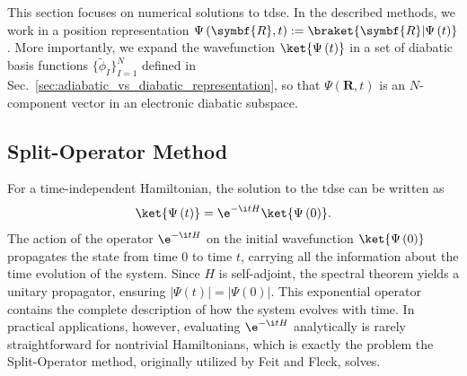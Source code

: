 \section{\filetotitle}\label{sec:numerical_schemes_for_time_dependent_schrodinger_equation}
This section focuses on numerical solutions to \acrshort{tdse}. In the described methods, we work in a position representation $\Psi\left(\symbf{R},t\right):=\braket{\symbf{R}\vert\Psi\left(t\right)}$. More importantly, we expand the wavefunction $\ket{\Psi\left(t\right)}$ in a set of diabatic basis functions $\lbrace\tilde\phi_I\rbrace_{I=1}^N$ defined in Sec.~\ref{sec:adiabatic_vs_diabatic_representation}, so that $\Psi\left(\symbf{R},t\right)$ is an $N$-component vector in an electronic diabatic subspace.
\subsection{Split-Operator Method}\label{sec:split_operator_method}
For a time-independent Hamiltonian, the solution to the \acrshort{tdse} can be written as
\begin{equation}\label{eq:tdse_propagator}
\ket{\Psi\left(t\right)}=\e^{-\i tH}\ket{\Psi\left(0\right)}.
\end{equation}
The action of the operator $\e^{-\i tH}$ on the initial wavefunction $\ket{\Psi\left(0\right)}$ propagates the state from time $0$ to time $t$, carrying all the information about the time evolution of the system. Since $H$ is self-adjoint, the spectral theorem yields a unitary propagator, ensuring $\lvert\Psi(t)\rvert=\lvert\Psi(0)\rvert$. This exponential operator contains the complete description of how the system evolves with time. In practical applications, however, evaluating $\e^{-\i tH}$ analytically is rarely straightforward for nontrivial Hamiltonians, which is exactly the problem the Split-Operator method, originally utilized by Feit and Fleck, solves.\supercite{10.1063/1.447051}

